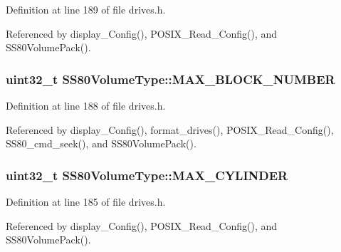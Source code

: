 Definition at line 189 of file drives.\+h.



Referenced by display\+\_\+\+Config(), P\+O\+S\+I\+X\+\_\+\+Read\+\_\+\+Config(), and S\+S80\+Volume\+Pack().

\subsubsection[{\texorpdfstring{M\+A\+X\+\_\+\+B\+L\+O\+C\+K\+\_\+\+N\+U\+M\+B\+ER}{MAX_BLOCK_NUMBER}}]{\setlength{\rightskip}{0pt plus 5cm}uint32\+\_\+t S\+S80\+Volume\+Type\+::\+M\+A\+X\+\_\+\+B\+L\+O\+C\+K\+\_\+\+N\+U\+M\+B\+ER}\hypertarget{structSS80VolumeType_afe3db69c9ec54fa6d9fd48f3e6e9097b}{}\label{structSS80VolumeType_afe3db69c9ec54fa6d9fd48f3e6e9097b}


Definition at line 188 of file drives.\+h.



Referenced by display\+\_\+\+Config(), format\+\_\+drives(), P\+O\+S\+I\+X\+\_\+\+Read\+\_\+\+Config(), S\+S80\+\_\+cmd\+\_\+seek(), and S\+S80\+Volume\+Pack().

\subsubsection[{\texorpdfstring{M\+A\+X\+\_\+\+C\+Y\+L\+I\+N\+D\+ER}{MAX_CYLINDER}}]{\setlength{\rightskip}{0pt plus 5cm}uint32\+\_\+t S\+S80\+Volume\+Type\+::\+M\+A\+X\+\_\+\+C\+Y\+L\+I\+N\+D\+ER}\hypertarget{structSS80VolumeType_a53b65739246cea4e0d9095c88b03be8e}{}\label{structSS80VolumeType_a53b65739246cea4e0d9095c88b03be8e}


Definition at line 185 of file drives.\+h.



Referenced by display\+\_\+\+Config(), P\+O\+S\+I\+X\+\_\+\+Read\+\_\+\+Config(), and S\+S80\+Volume\+Pack().

